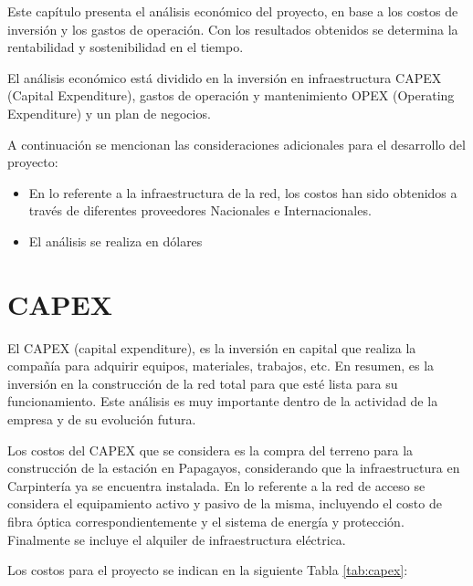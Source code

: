 Este capítulo presenta el análisis económico del proyecto, en base a los costos de inversión y los gastos de operación. Con los resultados obtenidos se determina la rentabilidad y sostenibilidad en el tiempo.

El análisis económico está dividido en la inversión en infraestructura CAPEX (Capital Expenditure), gastos de operación y mantenimiento OPEX (Operating Expenditure) y un plan de negocios. 

A continuación se mencionan las consideraciones adicionales para el desarrollo del proyecto: 

\begin{itemize}
\item En lo referente a la infraestructura de la red, los costos han sido obtenidos a través de diferentes proveedores Nacionales e Internacionales.
\item El análisis se realiza en dólares
\end{itemize}


\section{CAPEX}

El CAPEX (capital expenditure), es la inversión en capital que realiza la compañía para adquirir equipos, materiales, trabajos, etc. En resumen, es la inversión en la construcción de la red total para que esté lista para su funcionamiento. Este análisis es muy importante dentro de la actividad de la empresa y de su evolución futura.

Los costos del CAPEX que se considera es la compra del terreno para la construcción de la estación en Papagayos, considerando que la infraestructura en Carpintería ya se encuentra instalada. En lo referente a la red de acceso se considera el equipamiento activo y pasivo de la misma, incluyendo el costo de fibra óptica correspondientemente y el sistema de energía y protección. Finalmente se incluye el alquiler de infraestructura eléctrica.

Los costos para el proyecto se indican en la siguiente Tabla \ref{tab:capex}:

